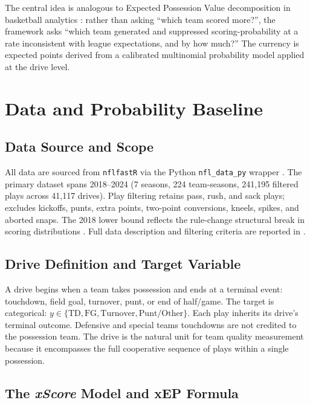 \documentclass[12pt,a4paper]{article}
\newcommand{\xscore}{\textit{xScore}}
\begin{document}
The central idea is analogous to Expected Possession Value decomposition in basketball analytics \citep{cervone2016multiresolution}: rather than asking ``which team scored more?'', the framework asks ``which team generated and suppressed scoring-probability at a rate inconsistent with league expectations, and by how much?'' The currency is expected points derived from a calibrated multinomial probability model applied at the drive level.

\section{Data and Probability Baseline}
\label{sec:data}

\subsection{Data Source and Scope}

All data are sourced from \texttt{nflfastR} \citep{carl2021nflfastr} via the Python \texttt{nfl\_data\_py} wrapper \citep{cooper2023nfldatapy}. The primary dataset spans 2018--2024 (7 seasons, 224 team-seasons, 241,195 filtered plays across 41,117 drives). Play filtering retains pass, rush, and sack plays; excludes kickoffs, punts, extra points, two-point conversions, kneels, spikes, and aborted snaps. The 2018 lower bound reflects the rule-change structural break in scoring distributions \citep{pereira2018roughing}. Full data description and filtering criteria are reported in \citet{mecha2026xscore-model}.

\subsection{Drive Definition and Target Variable}

A drive begins when a team takes possession and ends at a terminal event: touchdown, field goal, turnover, punt, or end of half/game. The target is categorical: $y \in \{\text{TD}, \text{FG}, \text{Turnover}, \text{Punt/Other}\}$. Each play inherits its drive's terminal outcome. Defensive and special teams touchdowns are not credited to the possession team. The drive is the natural unit for team quality measurement because it encompasses the full cooperative sequence of plays within a single possession.

\subsection{The \xscore{} Model and xEP Formula}
\end{document}
